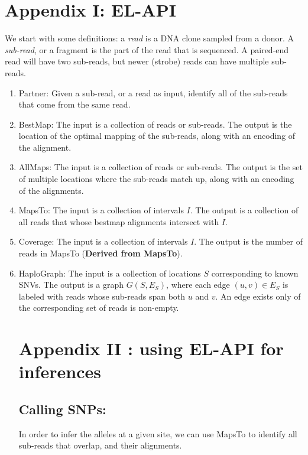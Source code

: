 \documentclass[11pt]{article}
\begin{document}
\newpage

\section{Appendix I: EL-API}

We start with some definitions: a \emph{read} is a DNA clone sampled
from a donor. A \emph{sub-read}, or a fragment is the part of the read
that is sequenced. A paired-end read will have two sub-reads, but
newer (strobe) reads can have multiple sub-reads.


\begin{enumerate}
\item {\sc Partner:} Given a sub-read, or a read as input, identify
  all of the sub-reads that come from the same read.
\item {\sc BestMap:} The input is a collection of reads or
  sub-reads. The output is the location of the optimal mapping of the
  sub-reads, along with an encoding of the alignment.
\item {\sc AllMaps:} The input is a collection of reads or
  sub-reads. The output is the set of multiple locations where the
  sub-reads match up, along with an encoding of the alignments.
\item {\sc MapsTo:} The input is a collection of intervals $I$. The
  output is a collection of all reads that whose bestmap alignments
  intersect with $I$.
\item {\sc Coverage:} The input is a collection of intervals $I$. The
  output is the number of reads in {\sc MapsTo} ({\bf Derived from
    MapsTo}).
\item {\sc HaploGraph:} The input is a collection of locations $S$
  corresponding to known SNVs. The output is a graph $G(S,E_S)$, where
  each edge $(u,v)\in E_S$ is labeled with reads whose sub-reads span
  both $u$ and $v$. An edge exists only of the corresponding set of
  reads is non-empty.

\newpage
\section{Appendix II : using EL-API for inferences}
\subsection{Calling SNPs:}
In order to infer the alleles at a given site, we can use {\sc MapsTo}
to identify all sub-reads that overlap, and their alignments.

\end{enumerate}
\end{document}
